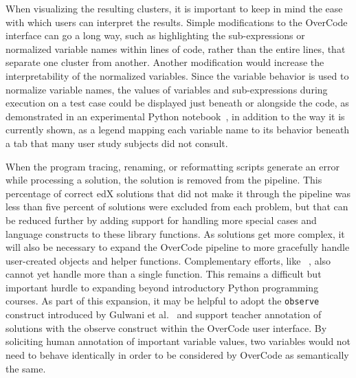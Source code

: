 When visualizing the resulting clusters, it is important to keep in mind the ease with which users can interpret the results. Simple modifications to the OverCode interface can go a long way, such as highlighting the sub-expressions or normalized variable names within lines of code, rather than the entire lines, that separate one cluster from another. Another modification would increase the interpretability of the normalized variables. Since the variable behavior is used to normalize variable names, the values of variables and sub-expressions during execution on a test case could be displayed just beneath or alongside the code, as demonstrated in an experimental Python notebook~\cite{kevinkwokdemo}, in addition to the way it is currently shown, as a legend mapping each variable name to its behavior beneath a tab that many user study subjects did not consult. 



When the program tracing, renaming, or reformatting scripts generate an error while processing a solution, the solution is removed from the pipeline. This percentage of correct edX solutions that did not make it through the pipeline was less than five percent of solutions were excluded from each problem, but that can be reduced further by adding support for handling more special cases and language constructs to these library functions. As solutions get more complex, it will also be necessary to expand the OverCode pipeline to more gracefully handle user-created objects and helper functions. Complementary efforts, like ~\cite{choudhury2016autostyle}, also cannot yet handle more than a single function. This remains a difficult but important hurdle to expanding beyond introductory Python programming courses. As part of this expansion, it may be helpful to adopt the \texttt{observe} construct introduced by Gulwani et al.~\cite{gulwani_fse14} and support teacher annotation of solutions with the observe construct within the OverCode user interface. By soliciting human annotation of important variable values, two variables would not need to behave identically in order to be considered by OverCode as semantically the same.%

